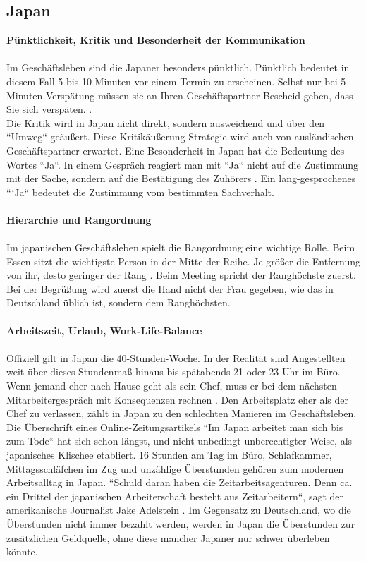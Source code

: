 	\subsection{Japan}
	\textbf{Pünktlichkeit, Kritik und Besonderheit der Kommunikation}\\
	\\
	Im Geschäftsleben sind die Japaner besonders pünktlich. Pünktlich bedeutet in diesem Fall 5 bis 10 Minuten vor einem Termin zu erscheinen. Selbst nur bei 5 Minuten Verspätung müssen sie an Ihren Geschäftspartner Bescheid geben, dass Sie sich verspäten. \cite{JPKnigge}. \\
	Die Kritik wird in Japan nicht direkt, sondern ausweichend und über den ``Umweg`` geäußert. Diese Kritikäußerung-Strategie wird auch von ausländischen Geschäftspartner erwartet. Eine Besonderheit in Japan hat die Bedeutung des Wortes ``Ja``. In einem Gespräch reagiert man mit ``Ja`` nicht auf die Zustimmung mit der Sache, sondern auf die Bestätigung des Zuhörers \cite{JPKnigge}. Ein lang-gesprochenes ```Ja`` bedeutet die Zustimmung vom bestimmten Sachverhalt.\\
	\\
	\textbf{Hierarchie und Rangordnung}\\
	\\
	Im japanischen Geschäftsleben spielt die Rangordnung eine wichtige Rolle.
	Beim Essen sitzt die wichtigste Person in der Mitte der Reihe. Je größer die Entfernung von ihr, desto geringer der Rang \cite{Business-KniggeFernost}.	
	Beim Meeting spricht der Ranghöchste zuerst. Bei der Begrüßung wird zuerst die Hand nicht der Frau gegeben, wie das in Deutschland üblich ist, sondern dem Ranghöchsten. \\
	\\
	\textbf{Arbeitszeit, Urlaub, Work-Life-Balance}\\
	\\
	Offiziell gilt in Japan die 40-Stunden-Woche. In der Realität sind Angestellten weit über dieses Stundenmaß hinaus bis spätabends 21 oder 23 Uhr im Büro. Wenn jemand eher nach Hause geht als sein Chef, muss er bei dem nächsten Mitarbeitergespräch mit Konsequenzen rechnen \cite{ArbZeitJP}. Den Arbeitsplatz eher als der Chef zu verlassen, zählt in Japan zu den schlechten Manieren im Geschäftsleben.
	Die Überschrift eines Online-Zeitungsartikels ``Im Japan arbeitet man sich bis zum Tode`` hat sich schon längst, und nicht unbedingt unberechtigter Weise, als japanisches Klischee etabliert. 
	16 Stunden am Tag im Büro, Schlafkammer, Mittagsschläfchen im Zug und unzählige Überstunden gehören zum modernen Arbeitsalltag in Japan. ``Schuld daran haben die Zeitarbeitsagenturen. Denn ca. ein Drittel der japanischen Arbeiterschaft besteht aus Zeitarbeitern``, sagt der amerikanische Journalist Jake Adelstein \cite{JPArbeit}. Im Gegensatz zu Deutschland, wo die Überstunden nicht immer bezahlt werden, werden in Japan die Überstunden zur zusätzlichen Geldquelle, ohne diese mancher Japaner nur schwer überleben könnte.
